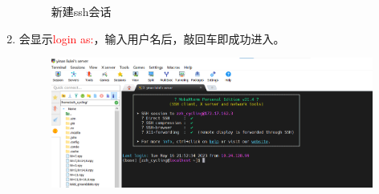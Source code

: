 \documentclass{article}
\def\mark{\textcolor{red}}
\begin{document}
\begin{enumerate}
\begin{figure}[H]
    \caption{新建ssh会话}
    \label{fig7}
\end{figure}
    \item 会显示\mark{login as:}，输入用户名后，敲回车即成功进入。
    \begin{figure}[H]
        \centering
        \includegraphics[scale=0.4]{figs/8.png}
    \end{figure}
\end{enumerate}
\end{document}

